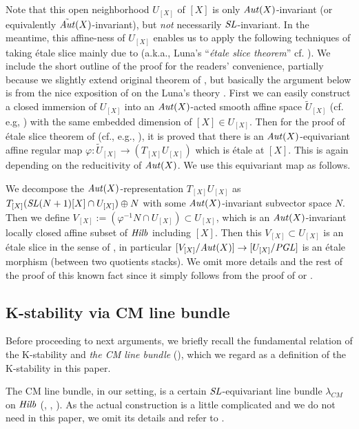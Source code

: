 \documentclass[12pt]{amsart}
\theoremstyle{remark}
\theoremstyle{definition}
\begin{document}
Note that this open neighborhood $U_{[X]}$ of $[X]$ 
is only ${\it Aut}(X)$-invariant (or equivalently $\tilde{\it Aut}(X)$-invariant),  
but \textit{not} necessarily ${\it SL}$-invariant. 
In the meantime, this affine-ness of $U_{[X]}$  
enables us to apply the following techniques of taking 
\'etale slice mainly due to \cite{Luna} (a.k.a., Luna's ``\textit{\'etale slice theorem}'' cf. \cite[5.3]
{Dre}). 
We include the short outline of the proof for the readers' convenience, partially 
because we slightly extend original theorem of \cite{Luna}, 
but basically the argument below is from the nice 
exposition of \cite{Dre} on the Luna's theory \cite{Luna}. 
First we can easily construct a closed immersion of $U_{[X]}$ into an 
${\it Aut}(X)$-acted smooth affine space 
$\tilde{U}_{[X]}$ (cf. e.g, \cite[Lemma 5.2]{Dre}) with the same embedded dimension 
of $[X]\in U_{[X]}$. 
Then for the proof of \'etale slice theorem of \cite{Luna} (cf., e.g., \cite[Lemma 
5.1]{Dre}), 
it is proved that there is an ${\it Aut}(X)$-equivariant affine regular map 
$\varphi \colon \tilde{U}_{[X]}\rightarrow (T_{[X]}U_{[X]})$ which is 
\'etale at $[X]$. This is again depending on the reducitivity of ${\it Aut}(X)$. 
We use this equivariant map as follows. 

We decompose the ${\it Aut}(X)$-representation $T_{[X]}U_{[X]}$ as 
$T_{[X]}({\it SL}(N+1)[X]\cap U_{[X]})\oplus N$ with some ${\it Aut}(X)$-invariant 
subvector space $N$. Then we define $V_{[X]}:=(\varphi^{-1}N\cap U_{[X]})\subset 
U_{[X]}$, which is an ${\it Aut}(X)$-invariant 
locally closed affine subset of ${\it Hilb}$ including $[X]$. 
Then this $V_{[X]}\subset U_{[X]}$ is an \'{e}tale slice in the sense of 
\cite{Luna, Dre}, in particular $[V_{[X]}/{\it Aut}(X)]\to [U_{[X]}/{\it PGL}]$ 
is an \'etale morphism (between two quotients stacks). 
We omit more details and the rest of the proof of this known fact since it 
simply follows from the proof of \cite[Theorem 5.3]{Dre} or 
\cite[subsection 2.2]{AK}. 

\subsection{K-stability via CM line bundle}\label{Kst.def}

Before proceeding to next arguments, we briefly recall the fundamental relation of the 
K-stability and \textit{the CM line bundle} (\cite{FS, PT}), 
which we regard as a definition of the K-stability in this paper. 

The CM line bundle, in our setting, is a certain ${\it SL}$-equivariant line bundle $\lambda_{CM}$ on ${\it Hilb}$ (\cite{FS}, \cite{PT}, \cite{FR}). As the actual construction is a little complicated and 
we do not need in this paper, we omit its details and refer to \cite{FR}. 
\end{document}
